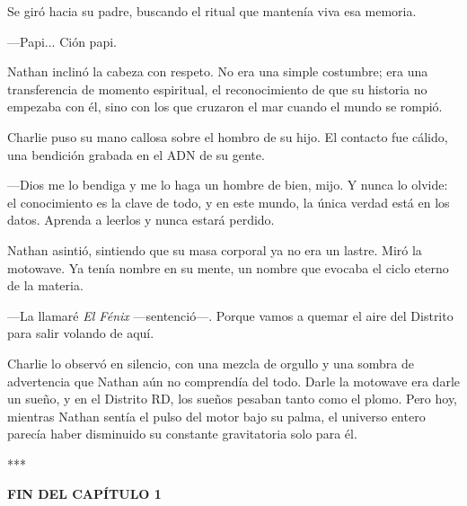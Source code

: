 \documentclass[11pt,twoside]{book}
\begin{document}
Se giró hacia su padre, buscando el ritual que mantenía viva esa memoria.

---Papi... Ción papi.

Nathan inclinó la cabeza con respeto. No era una simple costumbre; era una transferencia de momento espiritual, el reconocimiento de que su historia no empezaba con él, sino con los que cruzaron el mar cuando el mundo se rompió.

Charlie puso su mano callosa sobre el hombro de su hijo. El contacto fue cálido, una bendición grabada en el ADN de su gente.

---Dios me lo bendiga y me lo haga un hombre de bien, mijo. Y nunca lo olvide: el conocimiento es la clave de todo, y en este mundo, la única verdad está en los datos. Aprenda a leerlos y nunca estará perdido.

Nathan asintió, sintiendo que su masa corporal ya no era un lastre. Miró la motowave. Ya tenía nombre en su mente, un nombre que evocaba el ciclo eterno de la materia.

---La llamaré \textit{El Fénix} ---sentenció---. Porque vamos a quemar el aire del Distrito para salir volando de aquí.

Charlie lo observó en silencio, con una mezcla de orgullo y una sombra de advertencia que Nathan aún no comprendía del todo. Darle la motowave era darle un sueño, y en el Distrito RD, los sueños pesaban tanto como el plomo. Pero hoy, mientras Nathan sentía el pulso del motor bajo su palma, el universo entero parecía haber disminuido su constante gravitatoria solo para él.

\bigskip
\begin{center}***\end{center}
\bigskip

\textbf{FIN DEL CAPÍTULO 1}
\end{document}
